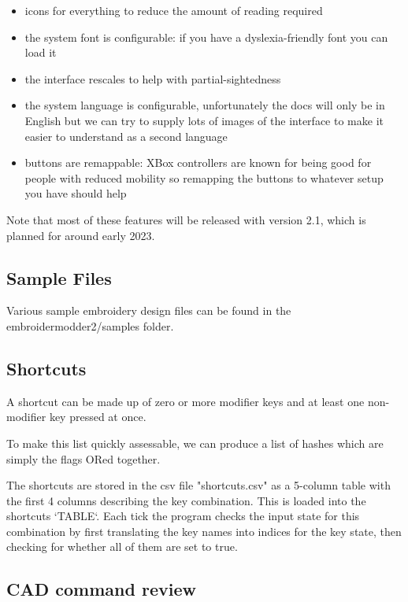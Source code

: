 \documentclass{report}
\begin{document}
\begin{itemize}
\item icons for everything to reduce the amount of reading required
\item the system font is configurable: if you have a dyslexia-friendly font you can load it
\item the interface rescales to help with partial-sightedness
\item the system language is configurable, unfortunately the docs will only be in English but we can try to supply lots of images of the interface to make it easier to understand as a second language
\item buttons are remappable: XBox controllers are known for being good for people with reduced mobility so remapping the buttons to whatever setup you have should help
\end{itemize}

Note that most of these features will be released with version 2.1, which is planned for around early 2023.

\subsection{Sample Files}

Various sample embroidery design files can be found in the embroidermodder2/samples folder.

\subsection{Shortcuts}

A shortcut can be made up of zero or more modifier keys and at least one non-modifier key pressed at once.

To make this list quickly assessable, we can produce a list of hashes which are simply the flags ORed together.

The shortcuts are stored in the csv file "shortcuts.csv"
as a 5-column table with the first 4 columns describing
the key combination. This is loaded into the shortcuts
`TABLE`. Each tick the program checks the input state for
this combination by first translating the key names into
indices for the key state, then checking for whether all
of them are set to true.

\subsection{CAD command review}
\end{document}
